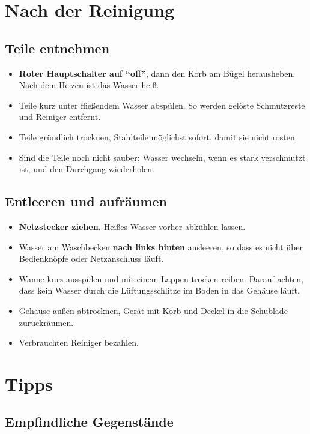 \documentclass{\basedir/fablab-document}
\begin{document}
	\section{Nach der Reinigung}

	\subsection{Teile entnehmen}

	\begin{itemize}
		\item \textbf{Roter Hauptschalter auf \enquote{off}}, dann den Korb am Bügel herausheben. Nach dem Heizen ist das Wasser heiß.
		\item Teile kurz unter fließendem Wasser abspülen. So werden gelöste Schmutzreste und Reiniger entfernt.
		\item Teile gründlich trocknen, Stahlteile möglichst sofort, damit sie nicht rosten.
		\item Sind die Teile noch nicht sauber: Wasser wechseln, wenn es stark verschmutzt ist, und den Durchgang wiederholen.
	\end{itemize}

	\subsection{Entleeren und aufräumen}

	\begin{itemize}
		\item \textbf{Netzstecker ziehen.} Heißes Wasser vorher abkühlen lassen.
		\item Wasser am Waschbecken \textbf{nach links hinten} ausleeren, so dass es nicht über Bedienknöpfe oder Netzanschluss läuft.
		\item Wanne kurz ausspülen und mit einem Lappen trocken reiben. Darauf achten, dass kein Wasser durch die Lüftungsschlitze im Boden in das Gehäuse läuft.
		\item Gehäuse außen abtrocknen, Gerät mit Korb und Deckel in die Schublade zurückräumen.
		\item Verbrauchten Reiniger bezahlen.
	\end{itemize}

	\section{Tipps}

	\subsection{Empfindliche Gegenstände}
	\label{sec:empfindlich}
\end{document}
